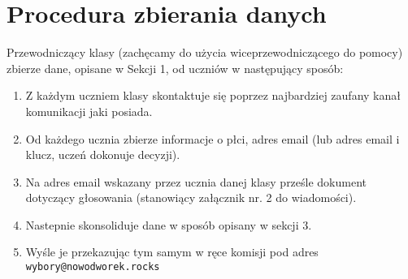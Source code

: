 \section{Procedura zbierania danych}

Przewodniczący klasy (zachęcamy do użycia wiceprzewodniczącego do pomocy) zbierze dane, opisane w Sekcji 1, od uczniów w następujący sposób:

\begin{enumerate}[label=(\arabic*)]%
  \item Z każdym uczniem klasy skontaktuje się poprzez najbardziej zaufany kanał komunikacji jaki posiada.
  \item Od każdego ucznia zbierze informacje o płci, adres email (lub adres email i klucz, uczeń dokonuje decyzji).
  \item Na adres email wskazany przez ucznia danej klasy prześle dokument dotyczący głosowania (stanowiący załącznik nr. 2 do wiadomości).
  \item Nastepnie skonsoliduje dane w sposób opisany w sekcji 3.
  \item Wyśle je przekazując tym samym w ręce komisji pod adres \texttt{wybory@nowodworek.rocks}
\end{enumerate}
